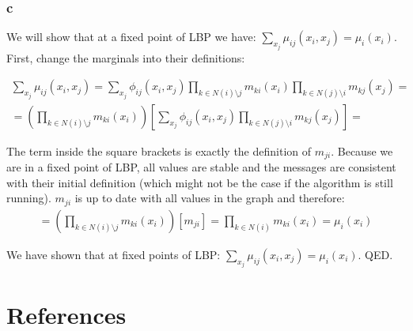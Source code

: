 \documentclass[11pt]{article}
\begin{document}
\section*{c}

We will show that at a fixed point of LBP we have: $\sum_{x_j} \mu_{ij}(x_i, x_j) = \mu_i(x_i)$. First, change the marginals into their definitions:

\begin{align}
\sum_{x_j} \mu_{ij}(x_i, x_j) = \sum_{x_j} \phi_{ij}(x_i,x_j) \prod_{k \in N(i) \setminus j} m_{ki}(x_i) \prod_{k \in N(j) \setminus i} m_{kj}(x_j) =\\
= \left(\prod_{k \in N(i) \setminus j} m_{ki}(x_i)\right) \left[\sum_{x_j} \phi_{ij}(x_i,x_j) \prod_{k \in N(j) \setminus i} m_{kj}(x_j)\right]=
\end{align}

The term inside the square brackets is exactly the definition of $m_{ji}$. Because we are in a fixed point of LBP, all values are stable and the messages are consistent with their initial definition (which might not be the case if the algorithm is still running). $m_{ji}$ is up to date with all values in the graph and therefore:
\begin{align}
= \left(\prod_{k \in N(i) \setminus j} m_{ki}(x_i)\right) \left[ m_{ji} \right] = \prod_{k \in N(i)} m_{ki}(x_i) = \mu_i(x_i)
\end{align}

We have shown that at fixed points of LBP: $\sum_{x_j} \mu_{ij}(x_i, x_j) = \mu_i(x_i)$. QED.

\part*{References}


\end{document}
